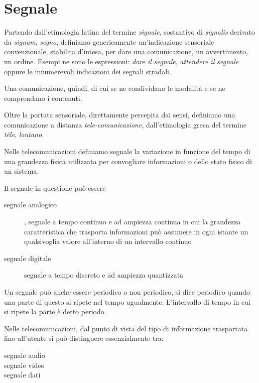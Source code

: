 
\section{Segnale}

Partendo dall'etimologia latina del termine \emph{signale}, sostantivo di
\emph{signalis} derivato da \emph{signum}, \emph{segno}, definiamo genericamente
un'indicazione sensoriale convenzionale, stabilita d'intesa, per dare una
comunicazione, un avvertimento, un ordine. Esempi ne sono le espressioni:
\emph{dare il segnale}, \emph{attendere il segnale} oppure le innumerevoli
indicazioni dei segnali stradali.

Una comunicazione, quindi, di cui se ne condividano le modalità e se ne
comprendano i contenuti.

Oltre la portata sensoriale, direttamente percepita dai sensi, definiamo
una comunicazione a distanza \emph{tele-comunicazione}, dall'etimologia greca
del termine \emph{têle}, \emph{lontano}.

Nelle telecomunicazioni definiamo segnale la variazione in funzione del tempo
di una grandezza fisica utilizzata per convogliare informazioni o dello stato
fisico di un sistema.

Il segnale in questione può essere

\begin{description}
  \item[segnale analogico], segnale a tempo continuo e ad ampiezza continua in
       cui la grandezza caratteristica che trasporta
       informazioni può assumere in ogni istante un qualsivoglia valore
       all'interno di un intervallo continuo
  \item[segnale digitale] segnale a tempo discreto e ad ampiezza quantizzata
\end{description}

Un segnale può anche essere periodico o non periodico, si dice periodico quando
una parte di questo si ripete nel tempo ugualmente. L'intervallo di tempo in cui
si ripete la parte è detto periodo.

Nelle telecomunicazioni, dal punto di vista del tipo di informazione trasportata
fino all'utente si può distinguere essenzialmente tra:

\begin{description}
\item[segnale audio]
\item[segnale video]
\item[segnale dati]
\end{description}

